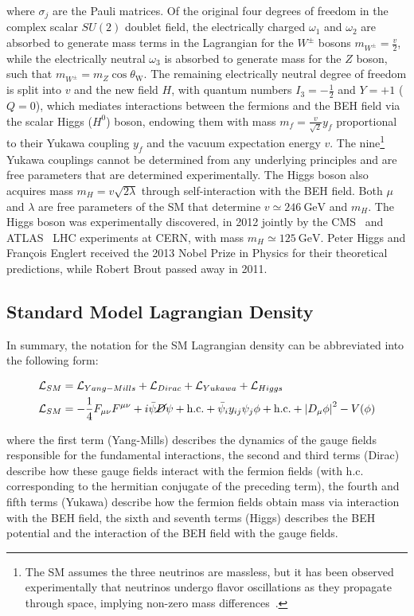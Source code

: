 \begin{refsection}
where $\sigma_j$ are the Pauli matrices.
Of the original four degrees of freedom in the complex scalar $SU(2)$ doublet field, the electrically charged $\omega_1$ and $\omega_2$ are absorbed to generate mass terms in the Lagrangian for the $W^\pm$ bosons $m_{W^\pm} = \frac{v}{2}$, while the electrically neutral $\omega_3$ is absorbed to generate mass for the $Z$ boson, such that $m_{W^\pm} = m_Z \cos \theta_{\mathrm{W}}$.
The remaining electrically neutral degree of freedom is split into $v$ and the new field $H$, with quantum numbers $I_3 = -\frac{1}{2}$ and $Y = +1$ ($Q = 0$), which mediates interactions between the fermions and the BEH field via the scalar Higgs ($H^0$) boson, endowing them with mass $m_f = \frac{v}{\sqrt{2}} y_f$ proportional to their Yukawa coupling $y_f$ and the vacuum expectation energy $v$.
The nine\footnote{The SM assumes the three neutrinos are massless, but it has been observed experimentally that neutrinos undergo flavor oscillations as they propagate through space, implying non-zero mass differences~\cite{PhysRevLett.81.1562}.} Yukawa couplings cannot be determined from any underlying principles and are free parameters that are determined experimentally.
The Higgs boson also acquires mass $m_H = v \sqrt{2 \lambda}$ through self-interaction with the BEH field.
Both $\mu$ and $\lambda$ are free parameters of the SM that determine $v \simeq \SI{246}{\GeV}$ and $m_H$.
The Higgs boson was experimentally discovered, in 2012 jointly by the CMS~\cite{201230} and ATLAS~\cite{20121} LHC experiments at CERN, with mass $m_H \simeq \SI{125}{\GeV}$.
Peter Higgs and François Englert received the 2013 Nobel Prize in Physics for their theoretical predictions, while Robert Brout passed away in 2011.

\subsection{Standard Model Lagrangian Density}
In summary, the notation for the SM Lagrangian density can be abbreviated into the following form:
\begin{linenomath*}
\begin{align}
\mathcal{L}_{SM} &= \mathcal{L}_{Yang-Mills} + \mathcal{L}_{Dirac} + \mathcal{L}_{Yukawa} + \mathcal{L}_{Higgs} \\
\mathcal{L}_{SM} &= -\frac{1}{4} F_{\mu \nu} F^{\mu \nu} + i\bar{\psi} \cancel{D} \psi+\text {h.c.} + \bar{\psi}_i y_{i j} \psi_j \phi+\text {h.c.} + \left \vert D_\mu \phi\right \vert^2 - V(\phi)
\end{align}
\end{linenomath*}
where the first term (Yang-Mills) describes the dynamics of the gauge fields responsible for the fundamental interactions, the second and third terms (Dirac) describe how these gauge fields interact with the fermion fields (with h.c. corresponding to the hermitian conjugate of the preceding term), the fourth and fifth terms (Yukawa) describe how the fermion fields obtain mass via interaction with the BEH field, the sixth and seventh terms (Higgs) describes the BEH potential and the interaction of the BEH field with the gauge fields.


\end{refsection}
